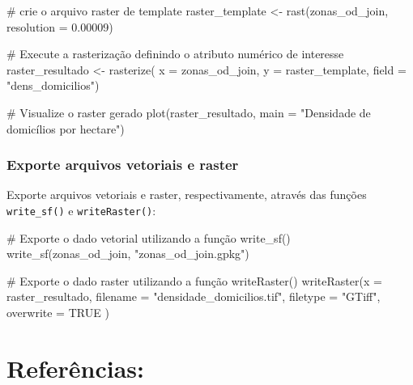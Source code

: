 \documentclass[
  letterpaper,
  DIV=11,
  numbers=noendperiod]{scrreprt}
\newenvironment{Shaded}{\begin{snugshade}}{\end{snugshade}}
\newcommand{\AttributeTok}[1]{\textcolor[rgb]{0.40,0.45,0.13}{#1}}
\newcommand{\CommentTok}[1]{\textcolor[rgb]{0.37,0.37,0.37}{#1}}
\newcommand{\ConstantTok}[1]{\textcolor[rgb]{0.56,0.35,0.01}{#1}}
\newcommand{\FloatTok}[1]{\textcolor[rgb]{0.68,0.00,0.00}{#1}}
\newcommand{\FunctionTok}[1]{\textcolor[rgb]{0.28,0.35,0.67}{#1}}
\newcommand{\NormalTok}[1]{\textcolor[rgb]{0.00,0.23,0.31}{#1}}
\newcommand{\OtherTok}[1]{\textcolor[rgb]{0.00,0.23,0.31}{#1}}
\newcommand{\StringTok}[1]{\textcolor[rgb]{0.13,0.47,0.30}{#1}}
\begin{document}
\begin{Shaded}
\begin{Highlighting}[]
\CommentTok{\# crie o arquivo raster de template}
\NormalTok{raster\_template }\OtherTok{\textless{}{-}} \FunctionTok{rast}\NormalTok{(zonas\_od\_join, }\AttributeTok{resolution =} \FloatTok{0.00009}\NormalTok{)}

\CommentTok{\# Execute a rasterização definindo o atributo numérico de interesse }
\NormalTok{raster\_resultado }\OtherTok{\textless{}{-}} \FunctionTok{rasterize}\NormalTok{( }\AttributeTok{x =}\NormalTok{ zonas\_od\_join, }\AttributeTok{y =}\NormalTok{ raster\_template, }\AttributeTok{field =} \StringTok{"dens\_domicilios"}\NormalTok{)}

\CommentTok{\# Visualize o raster gerado}
\FunctionTok{plot}\NormalTok{(raster\_resultado, }\AttributeTok{main =} \StringTok{"Densidade de domicílios por hectare"}\NormalTok{)}
\end{Highlighting}
\end{Shaded}

\subsubsection{\texorpdfstring{\textbf{Exporte arquivos vetoriais e
raster}}{Exporte arquivos vetoriais e raster}}\label{exporte-arquivos-vetoriais-e-raster}

Exporte arquivos vetoriais e raster, respectivamente, através das
funções \texttt{write\_sf()} e \texttt{writeRaster()}:

\begin{Shaded}
\begin{Highlighting}[]
\CommentTok{\# Exporte o dado vetorial utilizando a função write\_sf()}
\FunctionTok{write\_sf}\NormalTok{(zonas\_od\_join, }\StringTok{"zonas\_od\_join.gpkg"}\NormalTok{)}

\CommentTok{\# Exporte o dado raster utilizando a função writeRaster()}
\FunctionTok{writeRaster}\NormalTok{(}\AttributeTok{x =}\NormalTok{ raster\_resultado, }\AttributeTok{filename =} \StringTok{"densidade\_domicilios.tif"}\NormalTok{, }\AttributeTok{filetype =} \StringTok{"GTiff"}\NormalTok{, }\AttributeTok{overwrite =} \ConstantTok{TRUE}\NormalTok{ )}
\end{Highlighting}
\end{Shaded}

\section{Referências:}\label{referuxeancias-2}
\end{document}
